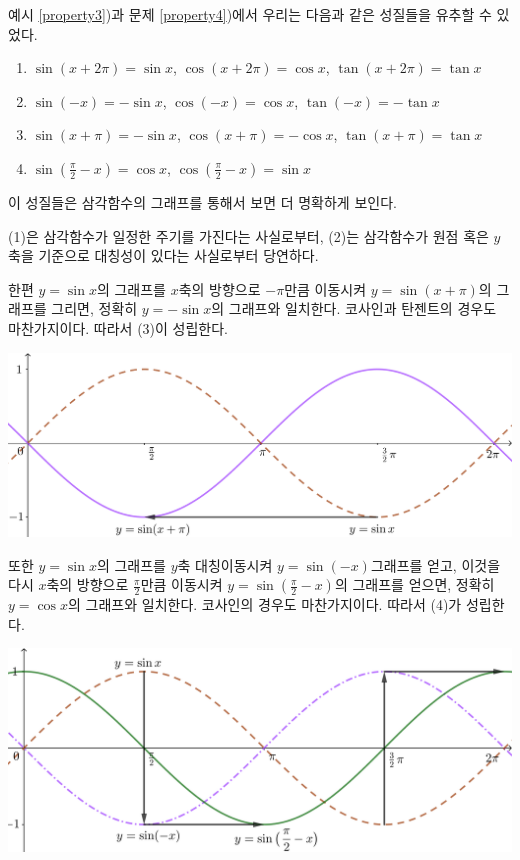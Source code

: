 \documentclass{oblivoir}
\begin{document}
\newpage
예시 \ref{property3})과 문제 \ref{property4})에서 우리는 다음과 같은 성질들을 유추할 수 있었다.
\begin{mdframed}
%
\theo{}
\begin{enumerate}\label{graph5}
\item
\(\sin(x+2\pi)=\sin x\), \(\cos(x+2\pi)=\cos x\), \(\tan(x+2\pi)=\tan x\)
\item
\(\sin(-x)=-\sin x\), \(\cos(-x)=\cos x\), \(\tan(-x)=-\tan x\)
\item
\(\sin(x+\pi)=-\sin x\), \(\cos(x+\pi)=-\cos x\), \(\tan(x+\pi)=\tan x\)
\item
\(\sin(\frac\pi2-x)=\cos x\), \(\cos(\frac\pi2-x)=\sin x\)
\end{enumerate}
\end{mdframed}
이 성질들은 삼각함수의 그래프를 통해서 보면 더 명확하게 보인다.

\bigskip
(1)은 삼각함수가 일정한 주기를 가진다는 사실로부터, (2)는 삼각함수가 원점 혹은 \(y\)축을 기준으로 대칭성이 있다는 사실로부터 당연하다.

\bigskip
한편 \(y=\sin x\)의 그래프를 \(x\)축의 방향으로 \(-\pi\)만큼 이동시켜 \(y=\sin(x+\pi)\)의 그래프를 그리면, 정확히 \(y=-\sin x\)의 그래프와 일치한다.
코사인과 탄젠트의 경우도 마찬가지이다.
따라서 (3)이 성립한다.
\begin{center}
\includegraphics[width=.7\textwidth]{graph_5-1}
\end{center}

\bigskip
또한 \(y=\sin x\)의 그래프를 \(y\)축 대칭이동시켜 \(y=\sin(-x)\)그래프를 얻고, 이것을 다시 \(x\)축의 방향으로 \(\frac\pi2\)만큼 이동시켜 \(y=\sin(\frac\pi2-x)\)의 그래프를 얻으면, 정확히 \(y=\cos x\)의 그래프와 일치한다.
코사인의 경우도 마찬가지이다.
따라서 (4)가 성립한다.
\begin{center}
\includegraphics[width=.7\textwidth]{graph_5-2}
\end{center}
\end{document}
